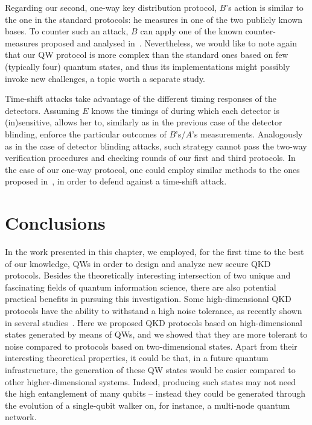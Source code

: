 Regarding our second, one-way key distribution protocol, $B$'s action is similar to the one in the standard protocols: he measures in one of the two publicly known bases. To counter such an attack, $B$ can apply one of the known counter-measures proposed and analysed in~\cite{liu:lin:kur:ska:mak:ger:14,sti:14,ele:ozh:kur:gol:mak:15,wan:wan:qin:wei:zha:16,lee:par:woo:par:kim:han:moo:16}. Nevertheless, we would like to note again that our QW protocol is more complex than the standard ones based on few (typically four) quantum states, and thus its implementations might possibly invoke new challenges, a topic worth a separate study. 

Time-shift attacks take advantage of the different timing responses of the detectors. Assuming $E$ knows the timings of during which each detector is (in)sensitive, allows her to, similarly as in the previous case of the detector blinding, enforce the particular outcomes of $B$'s/$A$'s measurements. Analogously as in the case of detector blinding attacks, such strategy cannot pass the two-way verification procedures and checking rounds of our first and  third protocols. In the case of our one-way protocol, one could employ similar methods to the ones proposed in~\cite{mak:ani:ska:06,lam:kur:07,zha:fun:qi:che:lo:08,qi:fun:lo:ma:07}, in order to defend against a time-shift attack. 

\newpage
\section{Conclusions}
In the work presented in this chapter, we employed, for the first time to the best of our knowledge, QWs in order to design and analyze new secure QKD protocols. Besides the theoretically interesting intersection of two unique and fascinating fields of quantum information science, there are also potential practical benefits in pursuing this investigation. Some high-dimensional QKD protocols have the ability to withstand a high noise tolerance, as recently shown in several studies~\cite{bec:tit:00,cer:bou:kar:gis:02,bru:chr:eke:eng:ber:kas:mac:03,nik:alb:05,she:sca:10,cha:15}. Here we proposed QKD protocols based on high-dimensional states generated by means of QWs, and we showed that they are more tolerant to noise compared to protocols based on two-dimensional states. Apart from their interesting theoretical properties, it could be that, in a future quantum infrastructure, the generation of these QW states would be easier compared to other higher-dimensional systems. Indeed, producing such states may not need the high entanglement of many qubits -- instead they could be generated through the evolution of a single-qubit walker on, for instance, a multi-node quantum network.

